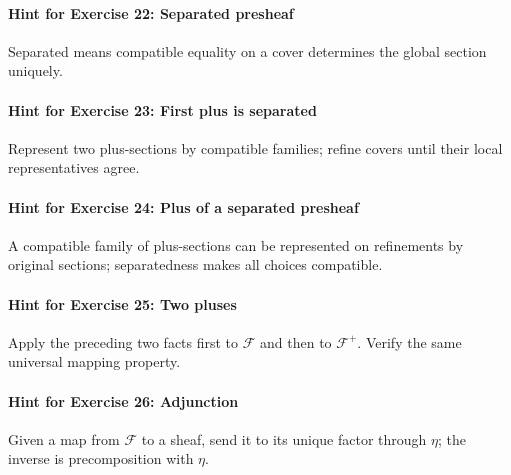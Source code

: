 \paragraph{Hint for Exercise 22: Separated presheaf}\mbox{}\par
Separated means compatible equality on a cover determines the global section uniquely.


\paragraph{Hint for Exercise 23: First plus is separated}\mbox{}\par
Represent two plus-sections by compatible families; refine covers until their local representatives agree.


\paragraph{Hint for Exercise 24: Plus of a separated presheaf}\mbox{}\par
A compatible family of plus-sections can be represented on refinements by original sections; separatedness makes all choices compatible.


\paragraph{Hint for Exercise 25: Two pluses}\mbox{}\par
Apply the preceding two facts first to $\mathcal F$ and then to $\mathcal F^+$.  Verify the same universal mapping property.


\paragraph{Hint for Exercise 26: Adjunction}\mbox{}\par
Given a map from $\mathcal F$ to a sheaf, send it to its unique factor through $\eta$; the inverse is precomposition with $\eta$.


